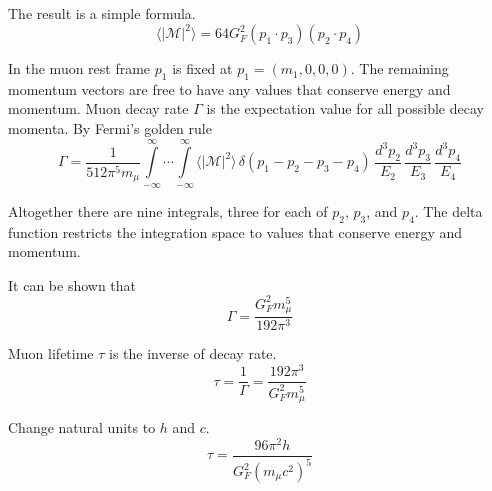 The result is a simple formula.
\begin{equation*}
\langle|\mathcal{M}|^2\rangle=64G_F^2(p_1\cdot p_3)(p_2\cdot p_4)
\end{equation*}

In the muon rest frame $p_1$ is fixed at $p_1=(m_1,0,0,0)$.
The remaining momentum vectors are free to have any values that conserve energy and momentum.
Muon decay rate $\Gamma$ is the expectation value for all possible decay momenta.
By Fermi's golden rule
\begin{equation*}
\Gamma=\frac{1}{512\pi^5m_\mu}
\int\limits_{-\infty}^\infty \cdots \int\limits_{-\infty}^\infty
\langle|\mathcal{M}|^2\rangle
\,\delta(p_1-p_2-p_3-p_4)
\,\frac{d^3p_2}{E_2}\,\frac{d^3p_3}{E_3}\,\frac{d^3p_4}{E_4}
\end{equation*}

Altogether there are nine integrals, three for each of $p_2$, $p_3$, and $p_4$.
The delta function restricts the integration space to values that conserve energy and momentum.

\bigskip
It can be shown that
\begin{equation*}
\Gamma=\frac{G_F^2 m_\mu^5}{192\pi^3}
\end{equation*}

Muon lifetime $\tau$ is the inverse of decay rate.
\begin{equation*}
\tau=\frac{1}{\Gamma}=\frac{192\pi^3}{G_F^2 m_\mu^5}
\end{equation*}

Change natural units to $h$ and $c$.
\begin{equation*}
\tau=\frac{96\pi^2h}{G_F^2\left(m_\mu c^2\right)^5}
\end{equation*}


